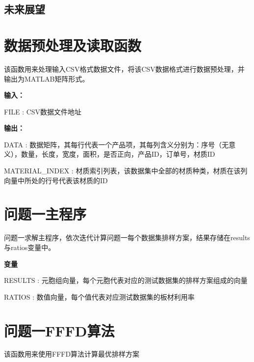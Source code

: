 \documentclass[bwprint]{gmcmthesis}
\begin{document}
\subsection{未来展望}




\newpage
\quad
\newpage





\cite{mittelbach_latex_2004,wright_latex3_2009,beeton_unicode_2008,vieth_experiences_2009}

\newpage
\appendix
\newpage
\section{数据预处理及读取函数}\label{数据预处理及读取函数}
该函数用来处理输入CSV格式数据文件，将该CSV数据格式进行数据预处理，并输出为MATLAB矩阵形式。

\textbf{输入：} 

FILE : CSV数据文件地址

\textbf{输出：} 

DATA : 数据矩阵，其每行代表一个产品项，其每列含义分别为：序号（无意义），数量，长度，宽度，面积，是否正向，产品ID，订单号，材质ID

MATERIAL\_INDEX : 材质索引列表，该数据集中全部的材质种类，材质在该列向量中所处的行号代表该材质的ID


\newpage
\section{问题一主程序}
问题一求解主程序，依次迭代计算问题一每个数据集排样方案，结果存储在results与ratios变量中。

\textbf{变量}

RESULTS : 元胞组向量，每个元胞代表对应的测试数据集的排样方案组成的向量

RATIOS : 数值向量，每个值代表对应测试数据集的板材利用率


\newpage
\section{问题一FFFD算法}\label{问题一FFFD算法}
该函数用来使用FFFD算法计算最优排样方案
\end{document}
